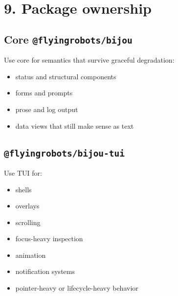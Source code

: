 \section{9. Package ownership}\label{record-021-package-ownership}

\subsection{\texorpdfstring{Core \texttt{@\allowbreak{}f\allowbreak{}l\allowbreak{}y\allowbreak{}i\allowbreak{}n\allowbreak{}g\allowbreak{}r\allowbreak{}o\allowbreak{}b\allowbreak{}o\allowbreak{}t\allowbreak{}s\allowbreak{}/\allowbreak{}b\allowbreak{}i\allowbreak{}j\allowbreak{}o\allowbreak{}u}}{Core }}\label{record-021-core-flyingrobotsbijou}

Use core for semantics that survive graceful degradation:

\begin{itemize}
\tightlist
\item
  status and structural components
\item
  forms and prompts
\item
  prose and log output
\item
  data views that still make sense as text
\end{itemize}

\subsection{\texorpdfstring{\texttt{@\allowbreak{}f\allowbreak{}l\allowbreak{}y\allowbreak{}i\allowbreak{}n\allowbreak{}g\allowbreak{}r\allowbreak{}o\allowbreak{}b\allowbreak{}o\allowbreak{}t\allowbreak{}s\allowbreak{}/\allowbreak{}b\allowbreak{}i\allowbreak{}j\allowbreak{}o\allowbreak{}u\allowbreak{}-\allowbreak{}t\allowbreak{}u\allowbreak{}i}}{}}\label{record-021-flyingrobotsbijou-tui}

Use TUI for:

\begin{itemize}
\tightlist
\item
  shells
\item
  overlays
\item
  scrolling
\item
  focus-heavy inspection
\item
  animation
\item
  notification systems
\item
  pointer-heavy or lifecycle-heavy behavior
\end{itemize}

